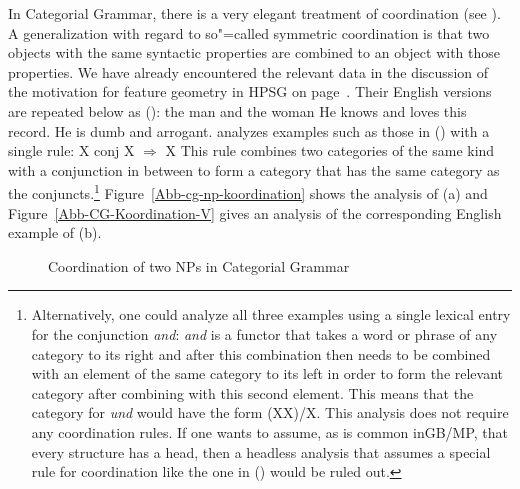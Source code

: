 \begin{exe}
\begin{xlist}[iv.]
\begin{exe}
\begin{xlist}[iv.]
In Categorial Grammar, there is a very elegant treatment of coordination (see \citealp{Steedman91a}). 
A generalization with regard to so"=called symmetric coordination is that two objects with the same syntactic properties are combined to an object
with those properties. We have already encountered the relevant data in the discussion of the motivation for feature geometry in HPSG on
page~\pageref{Seite-HPSG-Koordination}. Their English versions are repeated below as ():
\eal
\ex the man and the woman
\ex He knows and loves this record.
\ex He is dumb and arrogant.
\zl
\citet{Steedman91a} analyzes examples such as those in () with a single rule:
\ea
X conj X $\Rightarrow$ X
\z
This rule combines two categories of the same kind with a conjunction in between to form a category that has the same category as the conjuncts.\footnote{
Alternatively, one could analyze all three examples using a single lexical entry for the conjunction
\emph{and}: \emph{and} is a functor that takes a word or phrase
of any category to its right and after this combination then needs to be combined with an element of the same category to its left in order to form the relevant
category after combining with this second element. This means that the category for \emph{und} would have the form (X\bs X)/X. 
This analysis does not require any coordination rules. If one wants to assume, as is common in\indexgb GB/MP\indexmp, that every structure has a head, then a headless
analysis that assumes a special rule for coordination like the one in () would be ruled out.
}
Figure~\vref{Abb-cg-np-koordination} shows the analysis of (a) and
Figure~\vref{Abb-CG-Koordination-V} gives an analysis of the corresponding English example of
(b).
\begin{figure}
\centerline{%
}
\caption{\label{Abb-cg-np-koordination}Coordination of two NPs in Categorial Grammar}
\end{figure}%


\end{xlist}
\end{exe}
\end{xlist}
\end{exe}
